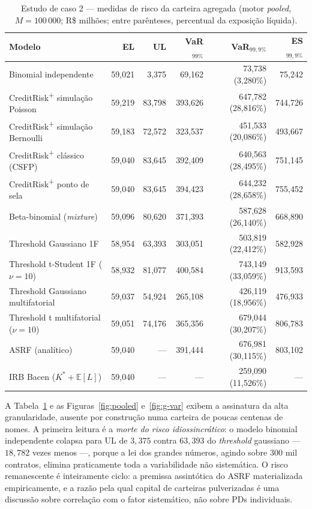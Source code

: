 \documentclass[11pt,a4paper]{article}
\newcommand{\E}{\mathbb{E}}
\begin{document}
\begin{table}[htb]
\centering\small
\caption{Estudo de caso 2 --- medidas de risco da carteira agregada (motor \emph{pooled}, $M=100\,000$; R\$ milhões; entre parênteses, percentual da exposição líquida).}
\label{tab:pooled}
\setlength{\tabcolsep}{3.5pt}
\begin{tabular}{lrrrrr}
\toprule
Modelo & EL & UL & VaR$_{99\%}$ & VaR$_{99,9\%}$ & ES$_{99,9\%}$ \\
\midrule
Binomial independente & 59{,}021 & 3{,}375 & 69{,}162 & 73{,}738 \;(3{,}280\%) & 75{,}242 \\
CreditRisk\textsuperscript{+} simulação Poisson & 59{,}219 & 83{,}798 & 393{,}626 & 647{,}782 \;(28{,}816\%) & 744{,}726 \\
CreditRisk\textsuperscript{+} simulação Bernoulli & 59{,}183 & 72{,}572 & 323{,}537 & 451{,}533 \;(20{,}086\%) & 493{,}667 \\
CreditRisk\textsuperscript{+} clássico (CSFP) & 59{,}040 & 83{,}645 & 392{,}409 & 640{,}563 \;(28{,}495\%) & 751{,}145 \\
CreditRisk\textsuperscript{+} ponto de sela & 59{,}040 & 83{,}645 & 394{,}423 & 644{,}232 \;(28{,}658\%) & 755{,}452 \\
Beta-binomial (\emph{mixture}) & 59{,}096 & 80{,}620 & 371{,}393 & 587{,}628 \;(26{,}140\%) & 668{,}890 \\
\midrule
Threshold Gaussiano 1F & 58{,}954 & 63{,}393 & 303{,}051 & 503{,}819 \;(22{,}412\%) & 582{,}928 \\
Threshold t-Student 1F ($\nu=10$) & 58{,}932 & 81{,}077 & 400{,}584 & 743{,}149 \;(33{,}059\%) & 913{,}593 \\
Threshold Gaussiano multifatorial & 59{,}037 & 54{,}924 & 265{,}108 & 426{,}119 \;(18{,}956\%) & 476{,}933 \\
Threshold t multifatorial ($\nu=10$) & 59{,}051 & 74{,}176 & 365{,}356 & 679{,}044 \;(30{,}207\%) & 806{,}783 \\
ASRF (analítico) & 59{,}040 & --- & 391{,}444 & 676{,}981 \;(30{,}115\%) & 803{,}102 \\
\midrule
IRB Bacen ($K^{*}+\E[L]$) & 59{,}040 & --- & --- & 259{,}090 \;(11{,}526\%) & --- \\
\bottomrule
\end{tabular}
\end{table}

A Tabela~\ref{tab:pooled} e as Figuras~\ref{fig:pooled} e~\ref{fig:g-var} exibem a assinatura da alta granularidade, ausente por construção numa carteira de poucas centenas de nomes. A primeira leitura é a \emph{morte do risco idiossincrático}: o modelo binomial independente colapsa para UL de $3{,}375$ contra $63{,}393$ do \emph{threshold} gaussiano --- $18{,}782$ vezes menos ---, porque a lei dos grandes números, agindo sobre $300$ mil contratos, elimina praticamente toda a variabilidade não sistemática. O risco remanescente é inteiramente ciclo: a premissa assintótica do ASRF materializada empiricamente, e a razão pela qual capital de carteiras pulverizadas é uma discussão sobre correlação com o fator sistemático, não sobre PDs individuais.
\end{document}
